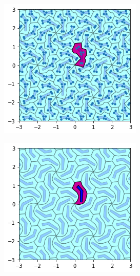 \documentclass[12pt]{report}
\begin{document}
\begin{figure}[H]
\begin{subfigure}[b]{0.3\textwidth}
    \includegraphics[width=\textwidth]{output_18_0.png}
    \label{fig:f8}
  \end{subfigure}
  \begin{subfigure}[b]{0.3\textwidth}
    \includegraphics[width=\textwidth]{output_21_2.png}
    \label{fig:f9}
  \end{subfigure}
\end{figure}
\end{document}
